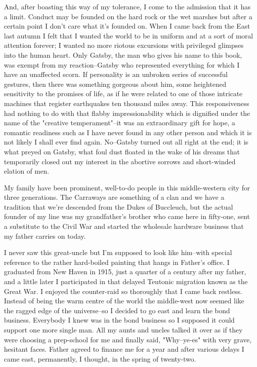 \documentclass[a4paper,12pt]{article}
\begin{document}
And, after boasting this way of my tolerance, I come to the admission
that it has a limit. Conduct may be founded on the hard rock or the wet
marshes but after a certain point I don't care what it's founded on.
When I came back from the East last autumn I felt that I wanted the
world to be in uniform and at a sort of moral attention forever; I
wanted no more riotous excursions with privileged glimpses into the
human heart. Only Gatsby, the man who gives his name to this book, was
exempt from my reaction--Gatsby who represented everything for which I
have an unaffected scorn. If personality is an unbroken series of
successful gestures, then there was something gorgeous about him, some
heightened sensitivity to the promises of life, as if he were related
to one of those intricate machines that register earthquakes ten
thousand miles away. This responsiveness had nothing to do with that
flabby impressionability which is dignified under the name of the
"creative temperament"--it was an extraordinary gift for hope, a romantic
readiness such as I have never found in any other person and which it
is not likely I shall ever find again. No--Gatsby turned out all right
at the end; it is what preyed on Gatsby, what foul dust floated in the
wake of his dreams that temporarily closed out my interest in the
abortive sorrows and short-winded elation of men.


My family have been prominent, well-to-do people in this middle-western
city for three generations. The Carraways are something of a clan and we
have a tradition that we're descended from the Dukes of Buccleuch, but the
actual founder of my line was my grandfather's brother who came here in
fifty-one, sent a substitute to the Civil War and started the wholesale
hardware business that my father carries on today.

I never saw this great-uncle but I'm supposed to look like him--with
special reference to the rather hard-boiled painting that hangs in
Father's office. I graduated from New Haven in 1915, just a quarter of a
century after my father, and a little later I participated in that
delayed Teutonic migration known as the Great War. I enjoyed the
counter-raid so thoroughly that I came back restless. Instead of being
the warm centre of the world the middle-west now seemed like the
ragged edge of the universe--so I decided to go east and learn the bond
business. Everybody I knew was in the bond business so I supposed it
could support one more single man. All my aunts and uncles talked it
over as if they were choosing a prep-school for me and finally said,
"Why--ye-es" with very grave, hesitant faces. Father agreed to finance
me for a year and after various delays I came east, permanently, I
thought, in the spring of twenty-two.
\end{document}
